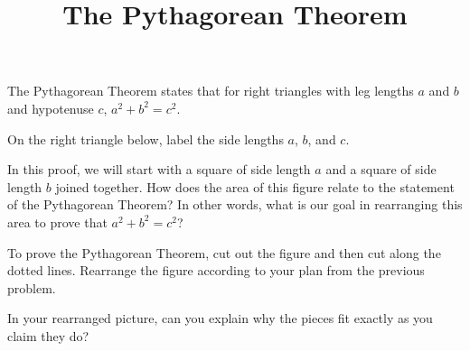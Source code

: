 \documentclass[nooutcomes,noauthor]{ximera}
\title{The Pythagorean Theorem}
\begin{document}
\begin{abstract}
\end{abstract}

\maketitle

The Pythagorean Theorem states that for right triangles with leg lengths $a$ and $b$ and hypotenuse $c$, $a^2 + b^2 = c^2$.
\begin{problem}
On the right triangle below, label the side lengths $a$, $b$, and $c$.
\begin{image}
\end{image}
\end{problem} \vfill

\begin{problem}
In this proof, we will start with a square of side length $a$ and a square of side length $b$ joined together. How does the area of this figure relate to the statement of the Pythagorean Theorem? In other words, what is our goal in rearranging this area to prove that $a^2 + b^2 = c^2$?
\begin{image}
\end{image}
\end{problem} \vfill


\newpage
\begin{problem} 
To prove the Pythagorean Theorem, cut out the figure and then cut along the dotted lines. Rearrange the figure according to your plan from the previous problem.
\begin{image}
\end{image}
\end{problem}

\begin{problem}
In your rearranged picture, can you explain why the pieces fit exactly as you claim they do?
\end{problem}
\end{document}
